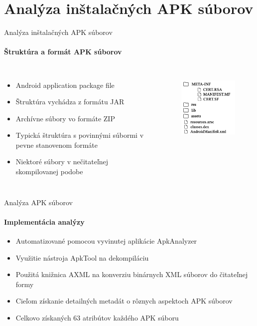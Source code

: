 \documentclass{beamer}
\begin{document}
\section{Analýza inštalačných APK súborov}
  \begin{frame}[label=lists]{Analýza inštalačných APK súborov}
   \framesubtitle{Štruktúra a formát APK súborov}
    \begin{columns}
       \begin{itemize}
		\item Android application package file	
		\item Štruktúra vychádza z formátu JAR
		\item Archívne súbory vo formáte ZIP
		\item Typická štruktúra s povinnými súbormi v pevne stanovenom formáte
		\item Niektoré súbory v nečitateľnej skompilovanej podobe
	\end{itemize}	  
        	 \begin{figure}[htb]
    \includegraphics[width=45mm]{images/apkStructure.pdf}
  \label{fig:strukturaApk}
\end{figure}
    \end{columns}
    
   \end{frame} 
    
  \begin{frame}[label=lists]{Analýza APK súborov}
  \framesubtitle{Implementácia analýzy}
	\begin{itemize}
		\item Automatizované pomocou vyvinutej aplikácie ApkAnalyzer\cite{apkanalyzer}
		\item Využitie nástroja ApkTool na dekompiláciu \cite{apktool}
		\item Použitá knižnica AXML na konverziu binárnych XML súborov do čitateľnej formy 
		\item Cieľom získanie detailných metadát o rôznych aspektoch APK súborov
		\item Celkovo získaných 63 atribútov každého APK súboru
	\end{itemize}	    
   \end{frame} 
   
\end{document}
